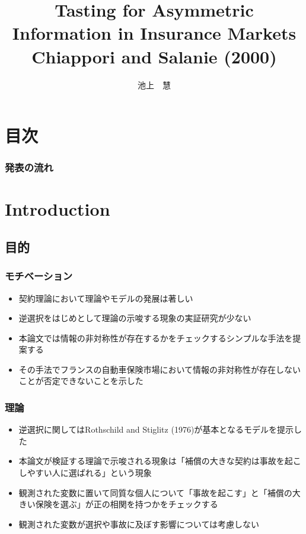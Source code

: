 \documentclass[dvipdfmx, 12pt]{beamer}
\title{Tasting for Asymmetric Information in Insurance Markets \\Chiappori and Salanie (2000)}
\author{池上　慧}
\begin{document}
\newcommand{\argmin}{\mathop{\rm arg~min}\limits}

\frame{\maketitle}

\section*{目次}
\begin{frame} \frametitle{発表の流れ}
\tableofcontents
\end{frame}

\section{Introduction}
\subsection{目的}
\begin{frame}\frametitle{モチベーション}
	\begin{itemize}
	\item 契約理論において理論やモデルの発展は著しい
	\item 逆選択をはじめとして理論の示唆する現象の実証研究が少ない
	\item 本論文では情報の非対称性が存在するかをチェックするシンプルな手法を提案する
	\item その手法でフランスの自動車保険市場において情報の非対称性が存在しないことが否定できないことを示した
	\end{itemize}
\end{frame}

\begin{frame}\frametitle{理論}
	\begin{itemize}
	\item 逆選択に関してはRothschild and Stiglitz (1976)が基本となるモデルを提示した
	\item 本論文が検証する理論で示唆される現象は「補償の大きな契約は事故を起こしやすい人に選ばれる」という現象
	\item 観測された変数に置いて同質な個人について「事故を起こす」と「補償の大きい保険を選ぶ」が正の相関を持つかをチェックする
	\item 観測された変数が選択や事故に及ぼす影響については考慮しない
	\end{itemize}
\end{frame}
\end{document}
